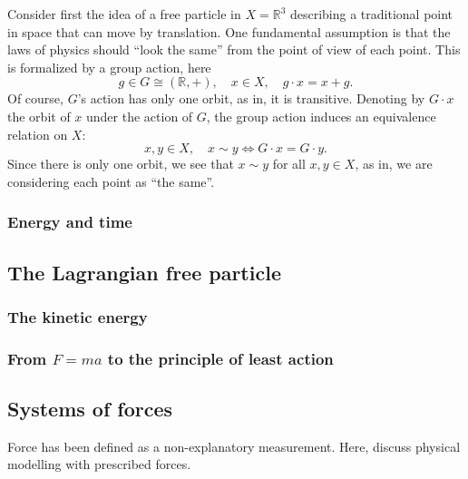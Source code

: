 \documentclass[11pt,a4paper]{memoir}
\begin{document}
Consider first the idea of a free particle in $X = \mathbb{R}^3$ describing a traditional point in space that can move by translation.
One fundamental assumption is that the laws of physics should ``look the same'' from the point of view of each point.
This is formalized by a group action, here
    $$g \in G \cong (\mathbb{R}, +),\quad x\in X,\quad g\cdot x = x + g.$$
Of course, $G$'s action has only one orbit, as in, it is transitive. Denoting by $G\cdot x$ the orbit of $x$ under the action of $G$,
the group action induces an equivalence relation on $X$:
    $$x, y \in X,\quad x \sim y \Leftrightarrow G\cdot x = G\cdot y.$$
Since there is only one orbit, we see that $x \sim y$ for all $x, y \in X$, as in, we are considering each point as ``the same''.
%

\subsubsection{Energy and time}
\subsection{The Lagrangian free particle}
\subsubsection{The kinetic energy}
\subsubsection{From $F=ma$ to the principle of least action}

\subsection{Systems of forces}
Force has been defined as a non-explanatory measurement. Here, discuss physical modelling with prescribed forces.
\end{document}
